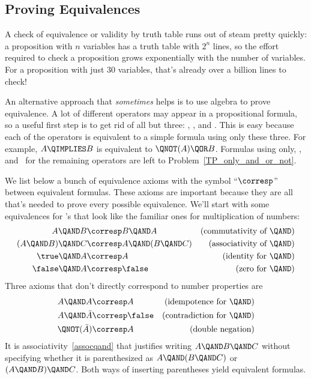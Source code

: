 \subsection{Proving Equivalences}\label{propositional_equivalences_sec}
A check of equivalence%
or validity by truth table runs out of steam
pretty quickly: a proposition with $n$ variables has a truth table
with $2^n$ lines, so the effort required to check a proposition
grows exponentially with the number of variables.  For a
proposition with just 30 variables, that's already over a billion
lines to check!

An alternative approach that \emph{sometimes} helps is to use algebra
to prove equivalence.  A lot of different operators may appear in a
propositional formula, so a useful first step is to get rid of all but
three: \QAND, \QOR, and \QNOT.  This is easy because each of the
operators is equivalent to a simple formula using only these three.
For example, $A \QIMPLIES B$ is equivalent to $\QNOT(A) \QOR B$.
Formulas using only\QAND, \QOR, and \QNOT\ for the remaining operators
are left to Problem~\ref{TP_only_and_or_not}.


We list below a bunch of equivalence axioms%
%
with the symbol ``$\corresp$'' between equivalent formulas.  These axioms are
important because they are all that's needed to prove every possible
equivalence.  We'll start with some equivalences for \QAND's that look
like the familiar ones for multiplication of numbers:
\begin{align}
A \QAND B           &\corresp B \QAND A
         & \text{(commutativity of \QAND)}\label{commutqand}\\
(A \QAND B)\QAND C  & \corresp A \QAND (B \QAND C)
         & \text{(associativity of \QAND)}\label{assocqand}\\
\true \QAND A           &\corresp A
         & \text{(identity for \QAND)}\notag\\
\false \QAND A           &\corresp \false
         & \text{(zero for \QAND)}\notag
\end{align}
Three axioms that don't directly correspond to number properties are
\begin{align}
A \QAND A       &\corresp A
         & \text{(idempotence for \QAND)}\notag\\
A \QAND \bar{A} & \corresp \false
         & \text{(contradiction for \QAND)}\label{QAND-contra}\\
\QNOT(\bar{A})  & \corresp A
         & \text{(double negation)}\label{double-neg}
\end{align}
It is associativity~\eqref{assocqand} that justifies writing $A \QAND
B \QAND C$ without specifying whether it is parenthesized as $A \QAND
(B \QAND C)$ or $(A \QAND B) \QAND C$.  Both ways of
inserting parentheses yield equivalent formulas.

